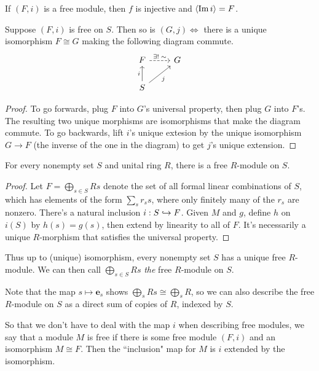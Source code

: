 \documentclass[twoside,10pt]{report}
\begin{document}
\begin{prop}
	If $(F,i)$ is a free module, then $f$ is injective and $\langle \operatorname{Im} i \rangle= F$.
\end{prop}

\begin{thrm}[Uniqueness]
	\label{thrm:free-unique}
	Suppose $(F,i)$ is free on $S$. Then so is $(G,j) \iff$ there is a unique isomorphism $F \cong G$ making the following diagram commute.
	\[
	\begin{tikzcd}
		F \rar[dashed]{\exists!\;\sim} & G \\
		S \uar{i}\arrow[ur,"j"']
	\end{tikzcd}
	\] 
\end{thrm}
\begin{proof}
	To go forwards, plug $F$ into $G$'s universal property, then plug $G$ into $F$'s. The resulting two unique morphisms are isomorphisms that make the diagram commute. To go backwards, lift $i$'s unique extesion by the unique isomorphism $G\to F$ (the inverse of the one in the diagram) to get $j$'s unique extension.
\end{proof}

\begin{thrm}[Existence]
	For every nonempty set $S$ and unital ring $R$, there is a free $R$-module on $S$.
\end{thrm}
\begin{proof}
	Let $F = \bigoplus_{s \in S}Rs$ denote the set of all formal linear combinations of $S$, which has elements of the form $\sum_s r_s s$, where only finitely many of the $r_s$ are nonzero. There's a natural inclusion $i: S \hookrightarrow F$. Given $M$ and $g$, define $h$ on $i(S)$ by $h(s) = g(s)$, then extend by linearity to all of $F$. It's necessarily a unique $R$-morphism that satisfies the universal property.
\end{proof}

\begin{note}[]
	Thus up to (unique) isomorphism, every nonempty set $S$ has a unique free $R$-module. We can then call $\bigoplus_{s \in S}Rs$ \textit{the} free $R$-module on $S$.
\end{note}

Note that the map $s \mapsto \mathbf{e}_{s}$ shows $\bigoplus_{s}Rs \cong \bigoplus_{s}R$, so we can also describe the free $R$-module on $S$ as a direct sum of copies of $R$, indexed by $S$.

So that we don't have to deal with the map $i$ when describing free modules, we say that a module $M$ is free if there is some free module $(F,i)$ and an isomorphism $M \cong F$. Then the ``inclusion" map for $M$ is $i$ extended by the isomorphism.
\end{document}
